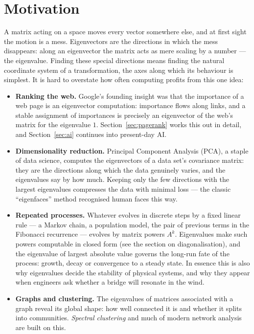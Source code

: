 \section{Motivation}

A matrix acting on a space moves every vector somewhere else, and at first sight the motion is a mess.
Eigenvectors are the directions in which the mess disappears: along an eigenvector the matrix acts as mere
scaling by a number — the eigenvalue. Finding these special directions means finding the natural
coordinate system of a transformation, the axes along which its behaviour is simplest. It is hard to
overstate how often computing profits from this one idea:

\begin{itemize}
\item \textbf{Ranking the web.} Google's founding insight was that the importance of a web page is an
eigenvector computation: importance flows along links, and a stable assignment of importances is precisely
an eigenvector of the web's matrix for the eigenvalue $1$. Section~\ref{sec:pagerank} works this out in
detail, and Section~\ref{sec:ai} continues into present-day AI.
\item \textbf{Dimensionality reduction.} Principal Component Analysis (PCA), a staple of data science,
computes the eigenvectors of a data set's covariance matrix: they are the directions along which the data
genuinely varies, and the eigenvalues say by how much. Keeping only the few directions with the largest
eigenvalues compresses the data with minimal loss — the classic ``eigenfaces'' method recognised human
faces this way.
\item \textbf{Repeated processes.} Whatever evolves in discrete steps by a fixed linear rule — a Markov
chain, a population model, the pair of previous terms in the Fibonacci recurrence — evolves by matrix
powers $A^k$. Eigenvalues make such powers computable in closed form (see the section on diagonalisation),
and the eigenvalue of largest absolute value governs the long-run fate of the process: growth, decay or convergence to a
steady state. In essence this is also why eigenvalues decide the stability of physical systems, and why
they appear when engineers ask whether a bridge will resonate in the wind.
\item \textbf{Graphs and clustering.} The eigenvalues of matrices associated with a graph reveal its
global shape: how well connected it is and whether it splits into communities. \emph{Spectral clustering}
and much of modern network analysis are built on this.
\end{itemize}

